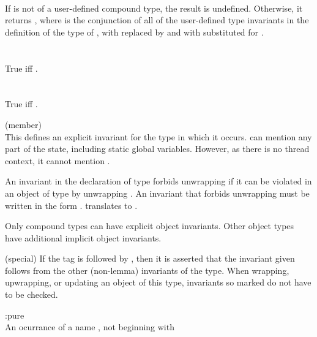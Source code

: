 \documentclass[preprint,nocopyrightspace]{sigplanconf}
\begin{document}
{{{\\
If  is not of a user-defined compound type, the result is 
undefined. Otherwise, it returns , where 
is the conjunction of all of the
user-defined type invariants in the definition of the type of ,
with  replaced by  and
with  substituted for \vcc{\this}.
\\\\
\noindent{}\\
True iff .
\\\\
\\
True iff .

 (member)\\
This defines an explicit invariant for the type in which it occurs.
 can mention any part of the state, including
static global variables. However, as there is no thread context, it
cannot mention \vcc{\me}.

An invariant in the declaration of type  forbids unwrapping if
it can be violated in an object  of type  by
unwrapping . An invariant that forbids unwrapping must be
written in the form . 
 translates to 
.

Only compound types can have explicit object invariants. Other object
types have additional implicit object invariants.

 (special)
If the  tag is followed by , then it is
asserted that the invariant given follows from the other (non-lemma)
invariants of the type. When wrapping, upwrapping, or updating an
object of this type, invariants so marked do not have to be checked.

 :pure\\
An ocurrance of a name , not beginning with }}}
\end{document}
